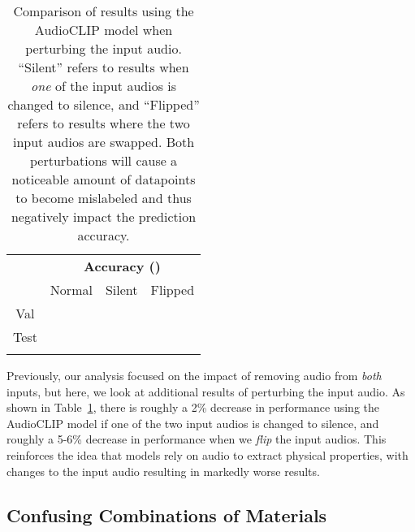\documentclass[runningheads]{llncs}
\begin{document}
\begin{table}[t]
\setlength{\tabcolsep}{6pt}
\renewcommand{\arraystretch}{1.2}
\centering
\begin{tabular}{c|c|c|c}
\Xhline{3\arrayrulewidth}
\multirow{2}{*}{Subset}   & \multicolumn{3}{c}{\textbf{Accuracy ()}} \\ \cline{2-4}
     &  Normal  & Silent & Flipped \\ \hline
     Val  &  &  &  \\
    Test &  &  &  \\
\Xhline{3\arrayrulewidth}
\end{tabular}
\vspace{1mm}
\caption{Comparison of results using the AudioCLIP model when perturbing the input audio. ``Silent'' refers to results when \textit{one} of the input audios is changed to silence, and ``Flipped'' refers to results where the two input audios are swapped. Both perturbations will cause a noticeable amount of datapoints to become mislabeled and thus negatively impact the prediction accuracy.}
\label{table:new_results}
\end{table}

Previously, our analysis focused on the impact of removing audio from \textit{both} inputs, but here, we look at additional results of perturbing the input audio. As shown in Table~\ref{table:new_results}, there is roughly a 2\% decrease in performance using the AudioCLIP model if one of the two input audios is changed to silence, and roughly a 5-6\% decrease in performance when we \textit{flip} the input audios. This reinforces the idea that models rely on audio to extract physical properties, with changes to the input audio resulting in markedly worse results.

\subsection{Confusing Combinations of Materials}
\end{document}
